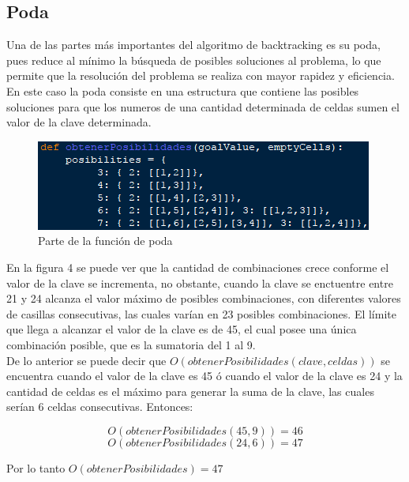 \documentclass[journal]{IEEEtran}
\begin{document}
\subsection{Poda}
Una de las partes más importantes del algoritmo de backtracking es su poda, pues reduce al mínimo la búsqueda de posibles soluciones al problema, lo que permite que la resolución del problema se realiza con mayor rapidez y eficiencia.\\
En este caso la poda consiste en una estructura que contiene las posibles soluciones para que los numeros de una cantidad determinada de celdas sumen el valor de la clave determinada.

\begin{figure}[h] 
        \centering \includegraphics[width=.9\columnwidth]{obtenerPosibilidades.png}
        \caption{
                \label{fig:samplesetup}
                Parte de la función de poda
        }
\end{figure}

En la figura 4 se puede ver que la cantidad de combinaciones crece conforme el valor de la clave se incrementa, no obstante, cuando la clave se enctuentre entre 21 y 24 alcanza el valor máximo de posibles combinaciones, con diferentes valores de casillas consecutivas, las cuales varían en 23 posibles combinaciones. El límite que llega a alcanzar el valor de la clave es de 45, el cual posee una única combinación posible, que es la sumatoria del 1 al 9.\\
De lo anterior se puede decir que $O(obtenerPosibilidades(clave, celdas))$ se encuentra cuando el valor de la clave es 45 ó cuando el valor de la clave es 24 y la cantidad de celdas es el máximo para generar la suma de la clave, las cuales serían 6 celdas consecutivas. Entonces:

\[O(obtenerPosibilidades(45, 9))=46\]
\[O(obtenerPosibilidades(24, 6))=47\]

Por lo tanto $O(obtenerPosibilidades)=47$
\end{document}
